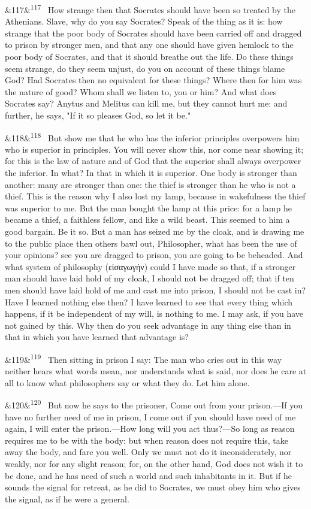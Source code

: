 \documentclass[12pt]{article}
\newcommand{\para}[1][]{\par\noindent\ifx&#1&\else\textsuperscript{\footnotesize #1}~\fi}
\begin{document}
\para[117] How strange then that Socrates should have been so treated by the Athenians. Slave, why do you say Socrates? Speak of the thing as it is: how strange that the poor body of Socrates should have been carried off and dragged to prison by stronger men, and that any one should have given hemlock to the poor body of Socrates, and that it should breathe out the life. Do these things seem strange, do they seem unjust, do you on account of these things blame God? Had Socrates then no equivalent for these things? Where then for him was the nature of good? Whom shall we listen to, you or him? And what does Socrates say? Anytus and Melitus can kill me, but they cannot hurt me: and further, he says, "If it so pleases God, so let it be."

\para[118] But show me that he who has the inferior principles overpowers him who is superior in principles. You will never show this, nor come near showing it; for this is the law of nature and of God that the superior shall always overpower the inferior. In what? In that in which it is superior. One body is stronger than another: many are stronger than one: the thief is stronger than he who is not a thief. This is the reason why I also lost my lamp, because in wakefulness the thief was superior to me. But the man bought the lamp at this price: for a lamp he became a thief, a faithless fellow, and like a wild beast. This seemed to him a good bargain. Be it so. But a man has seized me by the cloak, and is drawing me to the public place then others bawl out, Philosopher, what has been the use of your opinions? see you are dragged to prison, you are going to be beheaded. And what system of philosophy (εἰσαγωγήν) could I have made so that, if a stronger man should have laid hold of my cloak, I should not be dragged off; that if ten men should have laid hold of me and cast me into prison, I should not be cast in? Have I learned nothing else then? I have learned to see that every thing which happens, if it be independent of my will, is nothing to me. I may ask, if you have not gained by this. Why then do you seek advantage in any thing else than in that in which you have learned that advantage is?

\para[119] Then sitting in prison I say: The man who cries out in this way neither hears what words mean, nor understands what is said, nor does he care at all to know what philosophers say or what they do. Let him alone.

\para[120] But now he says to the prisoner, Come out from your prison.—If you have no further need of me in prison, I come out if you should have need of me again, I will enter the prison.—How long will you act thus?—So long as reason requires me to be with the body: but when reason does not require this, take away the body, and fare you well. Only we must not do it inconsiderately, nor weakly, nor for any slight reason; for, on the other hand, God does not wish it to be done, and he has need of such a world and such inhabitants in it. But if he sounds the signal for retreat, as he did to Socrates, we must obey him who gives the signal, as if he were a general.
\end{document}
